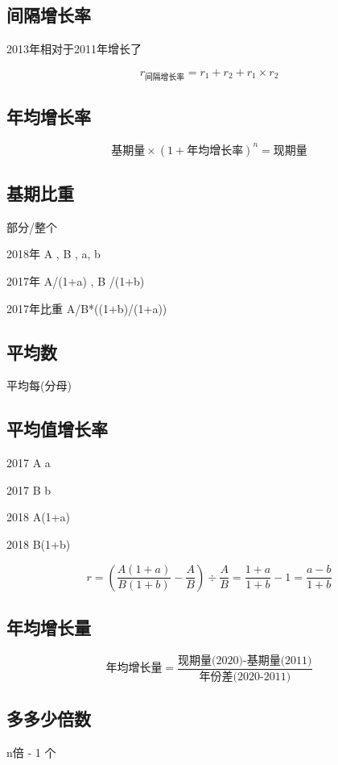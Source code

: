 \subsection{间隔增长率}

2013年相对于2011年增长了

$$
	r_{间隔增长率} = r_1 + r_2 + r_1 \times r_2
$$

\subsection{年均增长率}

$$
	\mbox{基期量} \times (1+\mbox{年均增长率})^n = \mbox{现期量}
$$


\subsection{基期比重}
部分/整个

2018年 A , B , a, b

2017年 A/(1+a) , B /(1+b)

2017年比重 A/B*((1+b)/(1+a))

\subsection{平均数}

平均每(分母)


\subsection{平均值增长率}
2017 A a

2017 B b

2018 A(1+a)

2018 B(1+b)

$$
	r = (\frac{A(1+a)}{B(1+b)} - \frac{A}{B}) \div \frac{A}{B} = \frac{1+a}{1+b} - 1 = \frac{a - b}{1+b}
$$

\subsection{年均增长量}

$$
	\mbox{年均增长量} = \frac{\mbox{现期量(2020)-基期量(2011)}}{\mbox{年份差(2020-2011)}}
$$


\subsection{多多少倍数}

n倍 - 1 个


